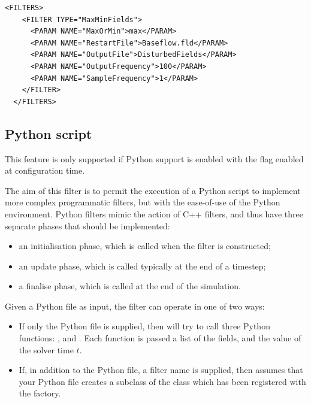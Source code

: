 \begin{lstlisting}[style=XMLStyle]
  <FILTERS>
    <FILTER TYPE="MaxMinFields">
      <PARAM NAME="MaxOrMin">max</PARAM>
      <PARAM NAME="RestartFile">Baseflow.fld</PARAM>
      <PARAM NAME="OutputFile">DisturbedFields</PARAM>
      <PARAM NAME="OutputFrequency">100</PARAM>
      <PARAM NAME="SampleFrequency">1</PARAM>
    </FILTER>                                                                                                                                                                                 
  </FILTERS>
\end{lstlisting}

\subsection{Python script}\label{filters:MaxMinFields}

\begin{notebox}
  This feature is only supported if Python support is enabled with the
   flag enabled at configuration time.
\end{notebox}

The aim of this filter is to permit the execution of a Python script to
implement more complex programmatic filters, but with the ease-of-use of the
Python environment. Python filters mimic the action of C++ filters, and thus
have three separate phases that should be implemented:
\begin{itemize}
  \item an initialisation phase, which is called when the filter is constructed;
  \item an update phase, which is called typically at the end of a timestep;
  \item a finalise phase, which is called at the end of the simulation.
\end{itemize}

Given a Python file as input, the filter can operate in one of two ways:

\begin{itemize}
  \item If only the Python file is supplied, then \nekpp will try to call three
  Python functions: ,  and
  . Each function is passed a list of the
   fields, and the value of the solver time $t$.
  \item If, in addition to the Python file, a filter name is supplied, then
  \nekpp assumes that your Python file creates a subclass of the 
  class which has been registered with the  factory.
\end{itemize}

